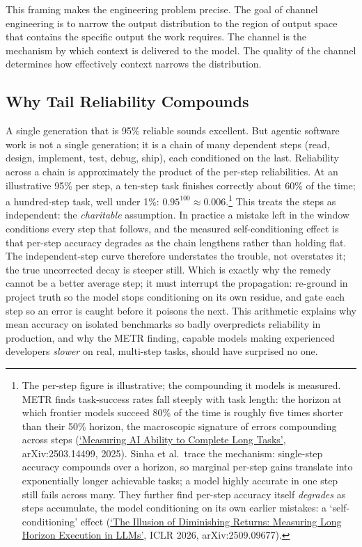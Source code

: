 \documentclass[11pt, a4paper]{article}
\begin{document}
This framing makes the engineering problem precise. The goal of channel engineering is to
narrow the output distribution to the region of output space that contains the specific
output the work requires. The channel is the mechanism by which context is delivered to
the model. The quality of the channel determines how effectively context narrows the
distribution.

\subsection{Why Tail Reliability Compounds}

A single generation that is 95\% reliable sounds excellent. But agentic software work is
not a single generation; it is a chain of many dependent steps (read, design, implement,
test, debug, ship), each conditioned on the last. Reliability across a chain
is approximately the product of the per-step reliabilities. At an illustrative 95\% per step, a ten-step
task finishes correctly about 60\% of the time; a hundred-step task, well under 1\%:
$0.95^{100}\approx 0.006$.\footnote{The per-step figure is illustrative; the compounding it
models is measured. METR finds task-success rates fall steeply with task length: the
horizon at which frontier models succeed 80\% of the time is roughly five times shorter
than their 50\% horizon, the macroscopic signature of errors compounding across steps
(\href{https://arxiv.org/abs/2503.14499}{`Measuring AI Ability to Complete Long Tasks'},
arXiv:2503.14499, 2025). Sinha et al.\ trace the mechanism: single-step accuracy compounds
over a horizon, so marginal per-step gains translate into exponentially longer achievable
tasks; a model highly accurate in one step still fails across many. They further find
per-step accuracy itself \emph{degrades} as steps accumulate, the model conditioning on its
own earlier mistakes: a `self-conditioning' effect
(\href{https://arxiv.org/abs/2509.09677}{`The Illusion of Diminishing Returns: Measuring
Long Horizon Execution in LLMs'}, ICLR 2026, arXiv:2509.09677).} This treats the steps as independent: the \emph{charitable} assumption. In practice a
mistake left in the window conditions every step that follows, and the measured
self-conditioning effect is that per-step accuracy degrades as the chain lengthens
rather than holding flat. The independent-step
curve therefore understates the trouble, not overstates it; the true uncorrected decay is
steeper still. Which is exactly why the remedy cannot be a better average step; it must
interrupt the propagation: re-ground in project truth so the model stops conditioning on
its own residue, and gate each step so an error is caught before it poisons the next.
This arithmetic explains why mean
accuracy on isolated benchmarks so badly overpredicts reliability in production, and why
the METR finding, capable models making experienced developers \emph{slower} on real,
multi-step tasks, should have surprised no one.
\end{document}
